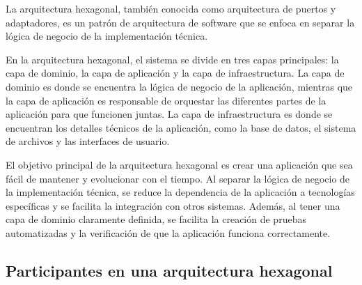 \documentclass[executivepaper]{article}
\begin{document}
La arquitectura hexagonal, también conocida como arquitectura de puertos y adaptadores, es un patrón de arquitectura de software que se enfoca en separar la lógica de negocio de la implementación técnica.

En la arquitectura hexagonal, el sistema se divide en tres capas principales: la capa de dominio, la capa de aplicación y la capa de infraestructura. La capa de dominio es donde se encuentra la lógica de negocio de la aplicación, mientras que la capa de aplicación es responsable de orquestar las diferentes partes de la aplicación para que funcionen juntas. La capa de infraestructura es donde se encuentran los detalles técnicos de la aplicación, como la base de datos, el sistema de archivos y las interfaces de usuario.

El objetivo principal de la arquitectura hexagonal es crear una aplicación que sea fácil de mantener y evolucionar con el tiempo. Al separar la lógica de negocio de la implementación técnica, se reduce la dependencia de la aplicación a tecnologías específicas y se facilita la integración con otros sistemas. Además, al tener una capa de dominio claramente definida, se facilita la creación de pruebas automatizadas y la verificación de que la aplicación funciona correctamente.

\subsection{Participantes en una arquitectura hexagonal}
\end{document}
